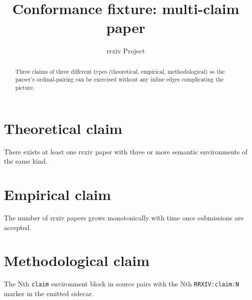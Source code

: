 \documentclass{rrxiv}
\title{Conformance fixture: multi-claim paper}
\author{rrxiv Project}
\begin{document}
\maketitle

\begin{abstract}
Three claims of three different types (theoretical, empirical,
methodological) so the parser's ordinal-pairing can be exercised
without any inline edges complicating the picture.
\end{abstract}

\section{Theoretical claim}

\begin{claim}[Existence]
\label{claim:existence}
There exists at least one rrxiv paper with three or more semantic
environments of the same kind.
\end{claim}

\section{Empirical claim}

\begin{claim}[Volume]
\label{claim:volume}
The number of rrxiv papers grows monotonically with time once
submissions are accepted.
\end{claim}

\section{Methodological claim}

\begin{claim}[Pairing]
\label{claim:pairing}
The Nth \texttt{claim} environment block in source pairs with the Nth
\texttt{RRXIV:claim:N} marker in the emitted sidecar.
\end{claim}
\end{document}
